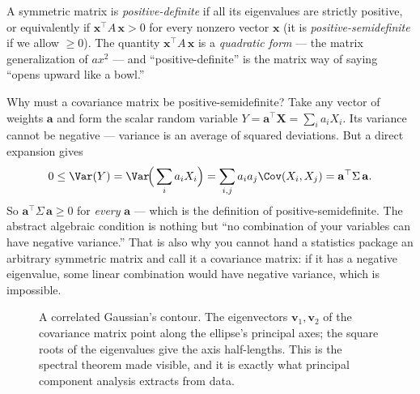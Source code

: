 A symmetric matrix is \emph{positive-definite} if all its eigenvalues are strictly positive, or
equivalently if $\mathbf{x}^\top A\,\mathbf{x} > 0$ for every nonzero vector $\mathbf{x}$ (it is
\emph{positive-semidefinite} if we allow $\ge 0$). The quantity $\mathbf{x}^\top A\,\mathbf{x}$ is a
\emph{quadratic form} --- the matrix generalization of $a x^2$ --- and ``positive-definite'' is the
matrix way of saying ``opens upward like a bowl.''

\begin{whybox}
Why must a covariance matrix be positive-semidefinite? Take any vector of weights $\mathbf{a}$ and
form the scalar random variable $Y=\mathbf{a}^\top \mathbf{X}=\sum_i a_i X_i$. Its variance cannot be
negative --- variance is an average of squared deviations. But a direct expansion gives
\[
  0 \le \Var(Y) = \Var\!\Big(\sum_i a_i X_i\Big)
      = \sum_{i,j} a_i a_j \Cov(X_i,X_j)
      = \mathbf{a}^\top \Sigma\,\mathbf{a}.
\]
So $\mathbf{a}^\top \Sigma\,\mathbf{a}\ge 0$ for \emph{every} $\mathbf{a}$ --- which is the definition
of positive-semidefinite. The abstract algebraic condition is nothing but ``no combination of your
variables can have negative variance.'' That is also why you cannot hand a statistics package an
arbitrary symmetric matrix and call it a covariance matrix: if it has a negative eigenvalue, some
linear combination would have negative variance, which is impossible.
\end{whybox}

\begin{figure}[H]
\centering
{}
\caption{A correlated Gaussian's contour. The eigenvectors $\mathbf{v}_1,\mathbf{v}_2$ of the
covariance matrix point along the ellipse's principal axes; the square roots of the eigenvalues give
the axis half-lengths. This is the spectral theorem made visible, and it is exactly what principal
component analysis extracts from data.}
\label{chAcla:fig-ellipse}
\end{figure}

